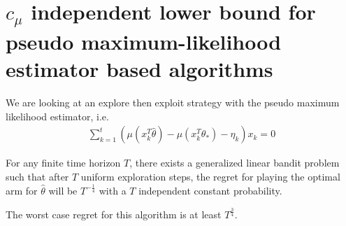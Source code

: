 \section{$c_{\mu}$ independent lower bound for pseudo maximum-likelihood estimator based algorithms}
We are looking at an explore then exploit strategy with the pseudo maximum likelihood estimator, i.e.
\begin{align}
    \sum_{k=1}^t(\mu(x_k^T\hat{\theta})-\mu(x_k^T\theta_*)-\eta_k)x_k = 0
\end{align}
\begin{theorem}
For any finite time horizon $T$, there exists a generalized linear bandit problem such that after $T$ uniform exploration steps, the regret for playing the optimal arm for $\hat{\theta}$ will be $T^{-\frac{1}{4}}$ with a $T$ independent constant probability.
\end{theorem}
\begin{corollary}
The worst case regret for this algorithm is at least $T^{\frac{3}{4}}$.
\end{corollary}
